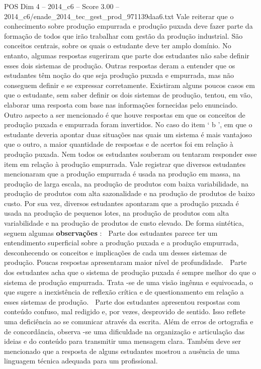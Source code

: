 \begin{textsample}{POS Dim 4 – 2014\_c6 – Score 3.00 – 2014\_c6/enade\_2014\_tec\_gest\_prod\_971139daa6.txt}
Vale reiterar que o conhecimento sobre produção empurrada e produção puxada deve fazer parte da formação de todos que irão trabalhar com gestão da produção industrial.
São conceitos centrais, sobre os quais o estudante deve ter amplo domínio.
No entanto, algumas respostas sugeriram que parte dos estudantes não sabe definir esses dois sistemas de produção.
Outras respostas deram a entender que os estudantes têm noção do que seja produção puxada e empurrada, mas não conseguem definir e se expressar corretamente.
Existiram alguns poucos casos em que o estudante, sem saber definir os dois sistemas de produção, tentou, em vão, elaborar uma resposta com base nas informações fornecidas pelo enunciado.
Outro aspecto a ser mencionado é que houve respostas em que os conceitos de produção puxada e empurrada foram invertidos.
No caso do item ‘ b ’, em que o estudante deveria apontar duas situações nas quais um sistema é mais vantajoso que o outro, a maior quantidade de respostas e de acertos foi em relação à produção puxada.
Nem todos os estudantes souberam ou tentaram responder esse item em relação à produção empurrada.
Vale registrar que diversos estudantes mencionaram que a produção empurrada é usada na produção em massa, na produção de larga escala, na produção de produtos com baixa variabilidade, na produção de produtos com alta sazonalidade e na produção de produtos de baixo custo.
Por sua vez, diversos estudantes apontaram que a produção puxada é usada na produção de pequenos lotes, na produção de produtos com alta variabilidade e na produção de produtos de custo elevado.
De forma sintética, seguem algumas \textbf{observações} :  Parte dos estudantes parece ter um entendimento superficial sobre a produção puxada e a produção empurrada, desconhecendo os conceitos e implicações de cada um desses sistemas de produção.
Poucas respostas apresentaram maior nível de profundidade.  Parte dos estudantes acha que o sistema de produção puxada é sempre melhor do que o sistema de produção empurrada.
Trata -se de uma visão ingênua e equivocada, o que sugere a inexistência de reflexão crítica e de questionamento em relação a esses sistemas de produção.  Parte dos estudantes apresentou respostas com conteúdo confuso, mal redigido e, por vezes, desprovido de sentido.
Isso reflete uma deficiência ao se comunicar através da escrita.
Além de erros de ortografia e de concordância, observa -se uma dificuldade na organização e articulação das ideias e do conteúdo para transmitir uma mensagem clara.
Também deve ser mencionado que a resposta de alguns estudantes mostrou a ausência de uma linguagem técnica adequada para um profissional.

\end{textsample}
